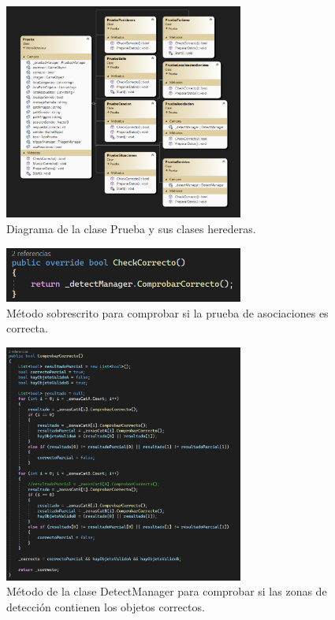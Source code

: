 \begin{figure}
	\centering
	\includegraphics[width=0.7\textwidth]{04.Desarrollo/05.Entrega5/01.Iteracion5_1/00.Figuras/18.diagrama_pruebas.png}
	\caption{Diagrama de la clase Prueba y sus clases herederas.}
	\label{fig:diagramaPruebas}
\end{figure}

\begin{figure}
	\centering
	\includegraphics[width=0.7\textwidth]{04.Desarrollo/05.Entrega5/01.Iteracion5_1/00.Figuras/19.check_correcto.png}
	\caption{Método sobrescrito para comprobar si la prueba de asociaciones es correcta.}
	\label{fig:checkCorrecto}
\end{figure}

\begin{figure}
	\centering
	\includegraphics[width=0.7\textwidth]{04.Desarrollo/05.Entrega5/01.Iteracion5_1/00.Figuras/20.detect_correcto.png}
	\caption{Método de la clase DetectManager para comprobar si las zonas de detección contienen los objetos correctos.}
	\label{fig:detectCorrecto}
\end{figure}






